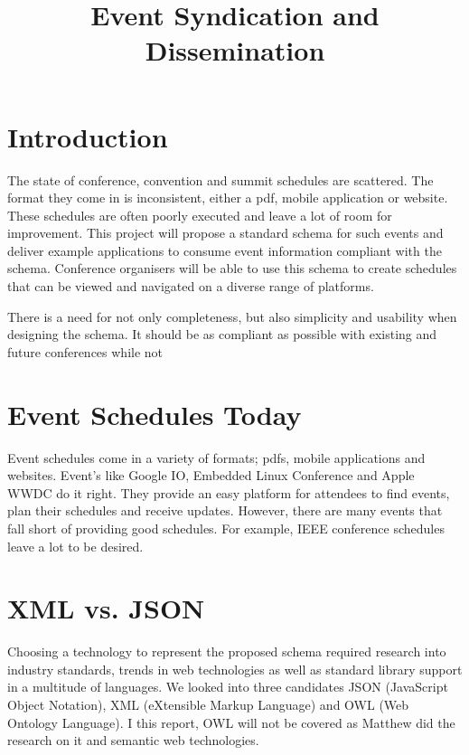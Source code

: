 \documentclass{article}
\title{Event Syndication and Dissemination}
\begin{document}


\maketitle

\begin{abstract}

\end{abstract}


\section{Introduction}
The state of conference, convention and summit schedules are scattered. The format they come in is inconsistent, either a pdf, mobile application or website. These schedules are often poorly executed and leave a lot of room for improvement. This project will propose a standard schema for such events and deliver example applications to consume event information compliant with the schema. Conference organisers will be able to use this schema to create schedules that can be viewed and navigated on a diverse range of platforms.

There is a need for not only completeness, but also simplicity and usability when designing the schema. It should be as compliant as possible with existing and future conferences while not

\section{Event Schedules Today}
Event schedules come in a variety of formats; pdfs, mobile applications and websites. Event's like Google IO\cite{googleIO2015}, Embedded Linux Conference\cite{embeddedlinuxconference2015} and Apple WWDC\cite{apple2014wwdc} do it right. They provide an easy platform for attendees to find events, plan their schedules and receive updates. However, there are many events that fall short of providing good schedules. For example, IEEE conference schedules \cite{ieeeIMC2014,ieeePSC2015,ieeeICC2014} leave a lot to be desired.

\section{XML vs. JSON}
Choosing a technology to represent the proposed schema required research into industry standards, trends in web technologies as well as standard library support in a multitude of languages. We looked into three candidates JSON (JavaScript Object Notation), XML (eXtensible Markup Language) and OWL (Web Ontology Language). I this report, OWL will not be covered as Matthew did the research on it and semantic web technologies.
\end{document}
